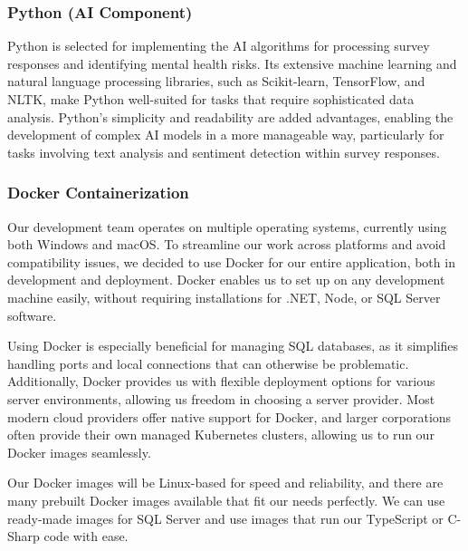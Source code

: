 \documentclass[conference]{IEEEtran}
\begin{document}
            \subsubsection{Python (AI Component)}
    
                Python is selected for implementing the AI algorithms for processing survey responses and identifying mental health risks. Its extensive machine learning and natural language processing libraries, such as Scikit-learn, TensorFlow, and NLTK, make Python well-suited for tasks that require sophisticated data analysis. Python’s simplicity and readability are added advantages, enabling the development of complex AI models in a more manageable way, particularly for tasks involving text analysis and sentiment detection within survey responses.
                \newline

            \subsubsection{Docker Containerization}
    
                Our development team operates on multiple operating systems, 
                currently using both Windows and macOS. To streamline our 
                work across platforms and avoid compatibility issues, 
                we decided to use Docker for our entire application, both in 
                development and deployment. Docker enables us to set up on 
                any development machine easily, without requiring installations 
                for .NET, Node, or SQL Server software. 
                \newline
                
                Using Docker is especially beneficial for managing SQL databases, as it simplifies handling ports and local connections that can otherwise be problematic. Additionally, Docker provides us with flexible deployment options for various server environments, allowing us freedom in choosing a server provider. Most modern cloud providers offer native support for Docker, and larger corporations often provide their own managed Kubernetes clusters, allowing us to run our Docker images seamlessly.
                \newline
            
                Our Docker images will be Linux-based for speed and reliability, and there are many prebuilt Docker images available that fit our needs perfectly. We can use ready-made images for SQL Server and use images that run our TypeScript or C-Sharp code with ease.
                \newline
\end{document}
